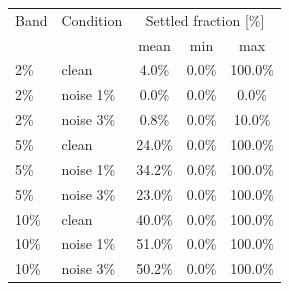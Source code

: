 \begin{tabular}{@{}llccc@{}}
\toprule
Band & Condition & \multicolumn{3}{c}{Settled fraction [\%]} \\
 & & mean & min & max \\
\midrule
2\% & clean & 4.0\% & 0.0\% & 100.0\% \\
2\% & noise 1\% & 0.0\% & 0.0\% & 0.0\% \\
2\% & noise 3\% & 0.8\% & 0.0\% & 10.0\% \\
5\% & clean & 24.0\% & 0.0\% & 100.0\% \\
5\% & noise 1\% & 34.2\% & 0.0\% & 100.0\% \\
5\% & noise 3\% & 23.0\% & 0.0\% & 100.0\% \\
10\% & clean & 40.0\% & 0.0\% & 100.0\% \\
10\% & noise 1\% & 51.0\% & 0.0\% & 100.0\% \\
10\% & noise 3\% & 50.2\% & 0.0\% & 100.0\% \\
\bottomrule
\end{tabular}
